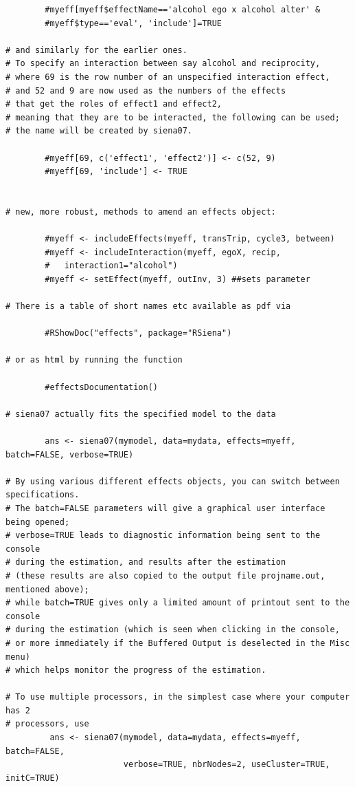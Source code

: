 \documentclass[a4paper,fleqn]{article}
\newcommand{\+}{\, + \,}
\begin{document}
{\begin{verbatim}
        #myeff[myeff$effectName=='alcohol ego x alcohol alter' &
        #myeff$type=='eval', 'include']=TRUE

# and similarly for the earlier ones.
# To specify an interaction between say alcohol and reciprocity,
# where 69 is the row number of an unspecified interaction effect,
# and 52 and 9 are now used as the numbers of the effects
# that get the roles of effect1 and effect2,
# meaning that they are to be interacted, the following can be used;
# the name will be created by siena07.

        #myeff[69, c('effect1', 'effect2')] <- c(52, 9)
        #myeff[69, 'include'] <- TRUE


# new, more robust, methods to amend an effects object:

        #myeff <- includeEffects(myeff, transTrip, cycle3, between)
        #myeff <- includeInteraction(myeff, egoX, recip,
        #   interaction1="alcohol")
        #myeff <- setEffect(myeff, outInv, 3) ##sets parameter

# There is a table of short names etc available as pdf via

        #RShowDoc("effects", package="RSiena")

# or as html by running the function

        #effectsDocumentation()

# siena07 actually fits the specified model to the data

        ans <- siena07(mymodel, data=mydata, effects=myeff, batch=FALSE, verbose=TRUE)

# By using various different effects objects, you can switch between specifications.
# The batch=FALSE parameters will give a graphical user interface being opened;
# verbose=TRUE leads to diagnostic information being sent to the console
# during the estimation, and results after the estimation
# (these results are also copied to the output file projname.out, mentioned above);
# while batch=TRUE gives only a limited amount of printout sent to the console
# during the estimation (which is seen when clicking in the console,
# or more immediately if the Buffered Output is deselected in the Misc menu)
# which helps monitor the progress of the estimation.

# To use multiple processors, in the simplest case where your computer has 2
# processors, use
         ans <- siena07(mymodel, data=mydata, effects=myeff, batch=FALSE,
                        verbose=TRUE, nbrNodes=2, useCluster=TRUE, initC=TRUE)


\end{verbatim}}
\end{document}
